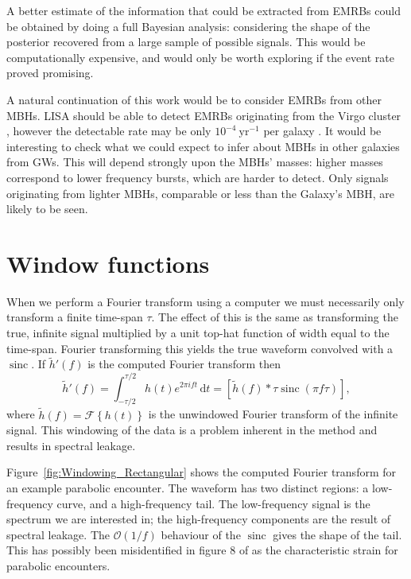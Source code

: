\documentclass[useAMS,usedcolumn,usegraphicx,usenatbib]{mn2e}
\newcommand{\Figref}[1]{Figure~\ref{fig:#1}}
\newcommand{\units}[1]{\ensuremath{~\mathrm{#1}}}
\DeclareMathOperator{\sinc}{sinc}
\newcommand{\dd}{\ensuremath{\mathrm{d}}}
\newcommand{\intd}[4]{\ensuremath{\int_{#1}^{#2}{#3}\,\dd{#4}}}
\newcommand{\order}[1]{\ensuremath{\mathcal{O}({#1})}}
\begin{document}
A better estimate of the information that could be extracted from EMRBs could be obtained by doing a full Bayesian analysis: considering the shape of the posterior recovered from a large sample of possible signals. This would be computationally expensive, and would only be worth exploring if the event rate proved promising.

A natural continuation of this work would be to consider EMRBs from other MBHs. LISA should be able to detect EMRBs originating from the Virgo cluster \citep{Rubbo2006}, however the detectable rate may be only $10^{-4}\units{yr^{-1}}$ per galaxy \citep{Hopman2007}. It would be interesting to check what we could expect to infer about MBHs in other galaxies from GWs. This will depend strongly upon the MBHs' masses: higher masses correspond to lower frequency bursts, which are harder to detect. Only signals originating from lighter MBHs, comparable or less than the Galaxy's MBH, are likely to be seen. 




\appendix

\section{Window functions}\label{ap:window}

When we perform a Fourier transform using a computer we must necessarily only transform a finite time-span $\tau$. The effect of this is the same as transforming the true, infinite signal multiplied by a unit top-hat function of width equal to the time-span. Fourier transforming this yields the true waveform convolved with a $\sinc$. If $\tilde{h}'(f)$ is the computed Fourier transform then
\begin{equation}
\tilde{h}'(f) = \intd{-\tau/2}{\tau/2}{h(t)e^{2\pi i ft}}{t} = \left[\tilde{h}(f) \ast \tau \sinc(\pi f\tau)\right],
\end{equation}
where $\tilde{h}(f) = \mathscr{F}\left\{h(t)\right\}$ is the unwindowed Fourier transform of the infinite signal. This windowing of the data is a problem inherent in the method and results in spectral leakage.

\Figref{Windowing_Rectangular} shows the computed Fourier transform for an example parabolic encounter. The waveform has two distinct regions: a low-frequency curve, and a high-frequency tail. The low-frequency signal is the spectrum we are interested in; the high-frequency components are the result of spectral leakage. The $\order{1/{f}}$ behaviour of the $\sinc$ gives the shape of the tail. This has possibly been misidentified in figure 8 of \citet{Burko2007} as the characteristic strain for parabolic encounters.
\end{document}
